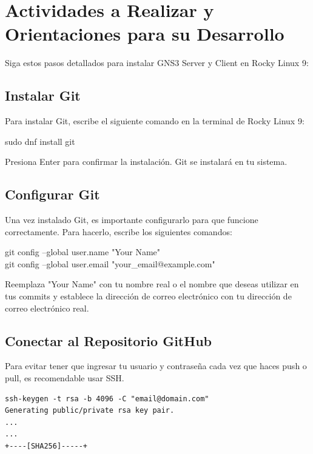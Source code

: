 \section{Actividades a Realizar y Orientaciones para su Desarrollo}
Siga estos pasos detallados para instalar GNS3 Server y Client en Rocky Linux 9:

\subsection{Instalar Git}

Para instalar Git, escribe el siguiente comando en la terminal de Rocky Linux 9: 
\begin{terbox} 
sudo dnf install git 
\end{terbox} 

Presiona Enter para confirmar la instalación. Git se instalará en tu sistema.

\subsection{Configurar Git}

Una vez instalado Git, es importante configurarlo para que funcione correctamente. Para hacerlo, escribe los siguientes comandos: 

\begin{terbox} 
git config --global user.name "Your Name"\\
git config --global user.email "your\_email@example.com" 
\end{terbox} 

Reemplaza "Your Name" con tu nombre real o el nombre que deseas utilizar en tus commits y establece la dirección de correo electrónico con tu dirección de correo electrónico real.



\subsection{Conectar al Repositorio GitHub}
Para evitar tener que ingresar tu usuario y contraseña cada vez que haces push o pull, 
es recomendable usar SSH. 
\begin{terbox}
\begin{verbatim}
ssh-keygen -t rsa -b 4096 -C "email@domain.com"
Generating public/private rsa key pair.
...
...
+----[SHA256]-----+

\end{verbatim}
\end{terbox}

